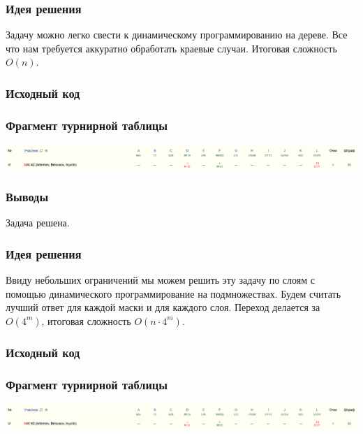 
\subsubsection*{Идея решения}
Задачу можно легко свести к динамическому программированию на дереве. Все что нам требуется аккуратно обработать краевые случаи. Итоговая сложность $O(n)$.
\subsubsection*{Исходный код}

\subsubsection*{Фрагмент турнирной таблицы}
\includegraphics[width=\textwidth]{images/220203.png}\newline\noindent
\subsubsection*{Выводы}
Задача решена.
\pagebreak


\subsubsection*{Идея решения}
Ввиду небольших ограничений мы можем решить эту задачу по слоям с помощью динамического программирование на подмножествах. Будем считать лучший ответ для каждой маски и для каждого слоя. Переход делается за $O(4^m)$, итоговая сложность $O(n \cdot 4^m)$.
\subsubsection*{Исходный код}

\subsubsection*{Фрагмент турнирной таблицы}
\includegraphics[width=\textwidth]{images/220203.png}\newline\noindent

